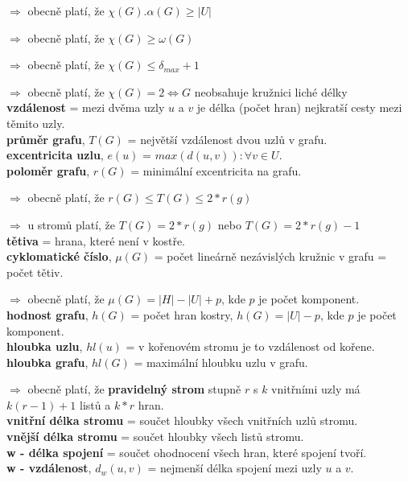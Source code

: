 \documentclass[12pt]{article}
\begin{document}
$\Rightarrow$ obecně platí, že $\chi(G) . \alpha(G) \geq \left|U\right|$

$\Rightarrow$ obecně platí, že $\chi(G) \geq \omega(G)$

$\Rightarrow$ obecně platí, že $\chi(G) \leq \delta_{max}+1$

$\Rightarrow$ obecně platí, že $\chi(G) = 2 \Leftrightarrow G$ neobsahuje kružnici liché délky\\

\noindent
\textbf{vzdálenost} = mezi dvěma uzly $u$ a $v$ je délka (počet hran) nejkratší cesty mezi těmito uzly.\\
\textbf{průměr grafu}, $T(G)$ = největší vzdálenost dvou uzlů v grafu.\\
\textbf{excentricita uzlu}, $e(u)$ = $max(d(u, v)) : \forall v \in U$.\\
\textbf{poloměr grafu}, $r(G)$ = minimální excentricita na grafu.

$\Rightarrow$ obecně platí, že $r(G) \leq T(G) \leq 2*r(g)$

$\Rightarrow$ u stromů platí, že $T(G) = 2*r(g)$ nebo $T(G) = 2*r(g)-1$\\


\noindent
\textbf{tětiva} = hrana, které není v kostře.\\
\textbf{cyklomatické číslo}, $\mu(G)$ = počet lineárně nezávislých kružnic v grafu = počet tětiv.

$\Rightarrow$ obecně platí, že $\mu(G) = \left|H\right| - \left|U\right| + p$, kde $p$ je počet komponent.\\
\textbf{hodnost grafu}, $h(G)$ = počet hran kostry, $h(G) = \left|U\right| - p$, kde $p$ je počet komponent.\\
\textbf{hloubka uzlu}, $hl(u)$ = v kořenovém stromu je to vzdálenost od kořene.\\
\textbf{hloubka grafu}, $hl(G)$ = maximální hloubku uzlu v grafu.

$\Rightarrow$ obecně platí, že \textbf{pravidelný strom} stupně $r$ s $k$ vnitřními uzly má $k(r-1)+1$ listů a $k*r$ hran.\\

\noindent
\textbf{vnitřní délka stromu} = součet hloubky všech vnitřních uzlů stromu.\\
\textbf{vnější délka stromu} = součet hloubky všech listů stromu.\\

\noindent
\textbf{w - délka spojení} = součet ohodnocení všech hran, které spojení tvoří.\\
\textbf{w - vzdálenost}, $d_w(u, v)$ = nejmenší délka spojení mezi uzly $u$ a $v$.\\
\end{document}
